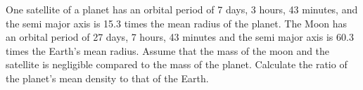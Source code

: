 One satellite of a planet has an orbital period of 7 days, 3 hours,
43 minutes, and the semi major axis is 15.3 times the mean radius of the
planet. The Moon has an orbital period of 27 days, 7 hours, 43 minutes and the
semi major axis is 60.3 times the Earth's mean radius. Assume that the mass of
the moon and the satellite is negligible compared to the mass of the planet.
Calculate the ratio of the planet's mean density to that of the Earth.
